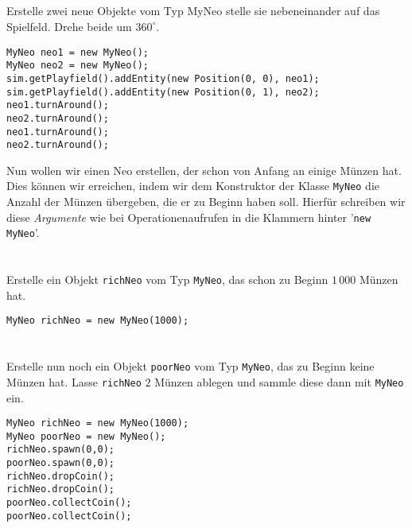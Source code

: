 \begin{questions}
\begin{parts}
    \part{}
    Erstelle zwei neue Objekte vom Typ MyNeo stelle sie nebeneinander auf das Spielfeld. Drehe beide um \(360^\circ\).
    \begin{solution}
    \begin{lstlisting}
MyNeo neo1 = new MyNeo();
MyNeo neo2 = new MyNeo();
sim.getPlayfield().addEntity(new Position(0, 0), neo1);
sim.getPlayfield().addEntity(new Position(0, 1), neo2);
neo1.turnAround();
neo2.turnAround();
neo1.turnAround();
neo2.turnAround();
    \end{lstlisting}
    \end{solution}
    \end{parts}

    Nun wollen wir einen Neo erstellen, der schon von Anfang an einige Münzen hat. Dies können wir erreichen, indem wir dem Konstruktor der Klasse \lstinline{MyNeo} die Anzahl der Münzen übergeben, die er zu Beginn haben soll. Hierfür schreiben wir diese \emph{Argumente} wie bei Operationenaufrufen in die Klammern hinter '\lstinline{new MyNeo}'.

    \begin{parts}
    \setcounter{partno}{1}
    \part{}
    Erstelle ein Objekt \lstinline{richNeo} vom Typ \lstinline{MyNeo}, das schon zu Beginn \(1\,000\) Münzen hat.
    \begin{solution}
    \begin{lstlisting}
MyNeo richNeo = new MyNeo(1000);
    \end{lstlisting}
    \end{solution}
    \part{}
    Erstelle nun noch ein Objekt \lstinline{poorNeo} vom Typ \lstinline{MyNeo},
    das zu Beginn keine Münzen hat.
    Lasse \lstinline{richNeo} {\(2\)} Münzen ablegen
    und sammle diese dann mit \lstinline{MyNeo} ein.
    \begin{solution} %
    \begin{lstlisting}
MyNeo richNeo = new MyNeo(1000);
MyNeo poorNeo = new MyNeo();
richNeo.spawn(0,0);
poorNeo.spawn(0,0);
richNeo.dropCoin();
richNeo.dropCoin();
poorNeo.collectCoin();
poorNeo.collectCoin();
    \end{lstlisting}
    \end{solution}
    \end{parts}



\end{questions}
